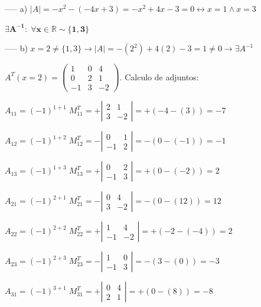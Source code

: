 \begin{proofw}\renewcommand{\qedsymbol}{$\diamond$}


	----- a) $|A|=-x^2-(-4x+3)=-x^2+4x-3=0 \leftrightarrow x=1 \wedge x=3$
	
$\boldsymbol{ \exists A^{-1}: \; \forall x\in \mathbb R \sim \{1,3\} }$

\noindent ----- b) $x=2 \neq \{1,3\} \to |A|=-(2^2)+4(2)-3=1\neq 0 \to \exists A^{-1}$

\noindent $A^T(x=2)=\left( \begin{matrix} 1&0&4\\0&2&1\\-1&3&-2  \end{matrix} \right)$.  Calculo de adjuntos:

\noindent $A_{11}=(-1)^{1+1}\; M^T_{11}=+ \left| \begin{matrix} 2&1\\3&-2  \end{matrix} \right|=+ (-4 -(3) )=-7 $

\noindent $A_{12}=(-1)^{1+2}\; M^T_{12}=- \left| \begin{matrix} 0&1\\-1&2  \end{matrix} \right|=- (0 -(-1) )=-1 $

\noindent $A_{13}=(-1)^{1+3}\; M^T_{13}=+ \left| \begin{matrix} 0&2\\-1&3  \end{matrix} \right|=+ ( 0-(-2) )= 2$

\noindent $A_{21}=(-1)^{2+1}\; M^T_{21}=- \left| \begin{matrix} 0&4\\3&-2  \end{matrix} \right|=- (0 -(12) )=12 $

\noindent $A_{22}=(-1)^{2+2}\; M^T_{22}=+ \left| \begin{matrix} 1&4\\-1&-2  \end{matrix} \right|=+ ( -2-(-4) )=2 $

\noindent $A_{23}=(-1)^{2+3}\; M^T_{23}=- \left| \begin{matrix} 1&0\\-1&3  \end{matrix} \right|=- (3 -(0) )=-3 $

\noindent $A_{31}=(-1)^{3+1}\; M^T_{31}=+ \left| \begin{matrix} 0&4\\2&1  \end{matrix} \right|=+ (0 -(8) )=-8 $


\end{proofw}
